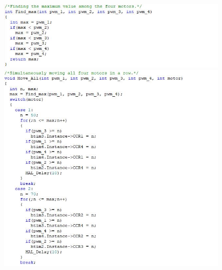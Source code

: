 	\begin{figure}[!h]
	\centering
	\includegraphics[width=\columnwidth]{./Images/Appendix/IMG_5.JPG}
		
	\vspace{0.5cm}
	\includegraphics[width=\columnwidth]{./Images/Appendix/IMG_6.JPG}
	\end{figure}
	
